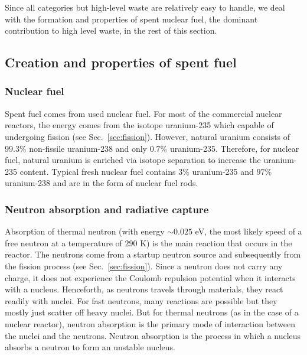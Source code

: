 \documentclass[nofootinbib,preprint,aps]{revtex4-1}
\begin{document}
    Since all categories but high-level waste are relatively easy to handle, we deal with the formation and
    properties of spent nuclear fuel, the dominant contribution to high level waste, in the rest of this section.

    \subsection{Creation and properties of spent fuel}
    \label{sec:waste:spentfuel}
    \subsubsection{Nuclear fuel}
    Spent fuel comes from used nuclear fuel.
    For most of the commercial nuclear reactors, the energy comes from the isotope uranium-235 which
    capable of undergoing fission (see Sec.~\ref{sec:fission}). However, natural uranium consists of $99.3\%$
    non-fissile uranium-238 and only $0.7\%$ uranium-235. Therefore, for nuclear fuel, natural uranium is enriched
    via isotope separation to increase the uranium-235 content. Typical fresh nuclear fuel contains $3\%$ uranium-235
    and $97\%$ uranium-238 and are in the form of nuclear fuel rods.

    \subsubsection{Neutron absorption and radiative capture}
    \label{sec:capture}
    Absorption of thermal neutron (with energy $\sim 0.025$ eV, the most likely speed of a free neutron at 
    a temperature of $290$ K) is the main reaction that
    occurs in the reactor. The neutrons come from a startup neutron source and subsequently from the fission
    process (see Sec.~\ref{sec:fission}).
    Since a neutron does not carry any charge, it does not experience the Coulomb repulsion potential when
    it interacts
    with a nucleus.
    Henceforth, as neutrons travels through materials, they react readily with nuclei.
    For fast neutrons, many reactions are possible but they mostly just scatter off heavy nuclei.
    But for thermal neutrons (as in the case of a nuclear reactor), neutron absorption
    is the primary mode of interaction between the nuclei and the neutrons.
    Neutron absorption is the process in which a nucleus absorbs a neutron to form an unstable
    nucleus.
\end{document}
